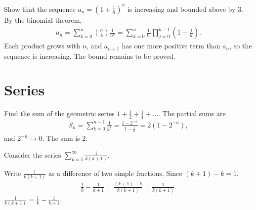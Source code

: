 
\begin{problem}
{
Show that the sequence $a_n = \left( 1 + \frac{1}{n} \right)^n$ is
increasing and bounded above by $3$.
}
{
By the binomial theorem,
\begin{align*}
    a_n = \sum_{k=0}^{n} \binom{n}{k} \frac{1}{n^k}
        = \sum_{k=0}^{n} \frac{1}{k!} \prod_{j=0}^{k-1} \left( 1 - \frac{j}{n} \right).
\end{align*}
Each product grows with $n$, and $a_{n+1}$ has one more positive term than
$a_n$, so the sequence is increasing. The bound remains to be proved.
}
{}
\end{problem}

\section{Series}


\begin{problem}
{
Find the sum of the geometric series $1 + \frac{1}{2} + \frac{1}{4} + \dots$.
\label{prob:geometric}
}
{
The partial sums are
\begin{align*}
    S_n = \sum_{k=0}^{n-1} \frac{1}{2^k}
        = \frac{1 - 2^{-n}}{1 - \frac{1}{2}}
        = 2 \left( 1 - 2^{-n} \right),
\end{align*}
and $2^{-n} \to 0$.
}
{
The sum is $2$.
}
\end{problem}


\begin{problem}
{
Consider the series $\displaystyle \sum_{k=1}^{\infty} \frac{1}{k (k + 1)}$.
\label{prob:telescoping}
}{}{}
\end{problem}

\begin{subproblem}
{
Write $\frac{1}{k (k + 1)}$ as a difference of two simple fractions.
\label{prob:telescoping-a}
}
{
Since $(k + 1) - k = 1$,
\begin{align*}
    \frac{1}{k} - \frac{1}{k + 1} = \frac{(k + 1) - k}{k (k + 1)}
                                  = \frac{1}{k (k + 1)}.
\end{align*}
}
{
$\frac{1}{k (k + 1)} = \frac{1}{k} - \frac{1}{k + 1}$.
}
\end{subproblem}

